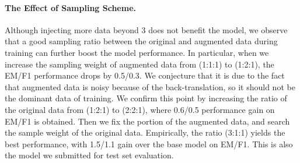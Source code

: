 \documentclass{article} \usepackage{iclr2018_conference,times}
\begin{document}
\paragraph{The Effect of Sampling Scheme.}
Although injecting more data beyond  3 does not benefit the model, we observe that a good sampling ratio between the original and augmented data during training can further boost the model performance. In particular, when we increase the sampling weight of augmented data from (1:1:1) to (1:2:1), the EM/F1 performance drops by 0.5/0.3. We conjecture that it is due to the fact that augmented data is noisy because of the back-translation, so it should not be the dominant data of training. We confirm this point by increasing the ratio of the original data from (1:2:1) to (2:2:1), where 0.6/0.5 performance gain on EM/F1 is obtained. Then we fix the portion of the augmented data, and search the sample weight of the original data. Empirically, the ratio (3:1:1) yields the best performance, with 1.5/1.1 gain over the base model on EM/F1. This is also the model we submitted for test set evaluation.
\end{document}
